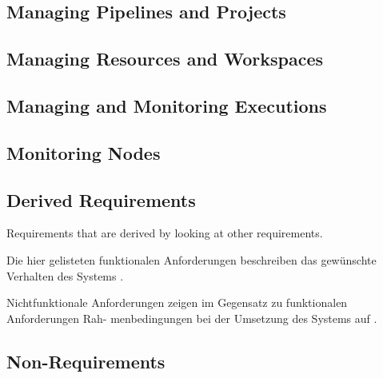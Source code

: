\subsection{Managing Pipelines and Projects}
\begin{itemize}
\end{itemize}

\subsection{Managing Resources and Workspaces}
\begin{itemize}
\end{itemize}


\subsection{Managing and Monitoring Executions}
\begin{itemize}
\end{itemize}

\subsection{Monitoring Nodes}
\begin{itemize}
\end{itemize}

\subsection{Derived Requirements} 
Requirements that are derived by looking at other requirements.



Die hier gelisteten funktionalen Anforderungen beschreiben das gewünschte Verhalten des
Systems \cite[155]{goll2012methoden}.

Nichtfunktionale Anforderungen zeigen im Gegensatz zu funktionalen Anforderungen Rah-
menbedingungen bei der Umsetzung des Systems auf \cite[155]{goll2012methoden}.


\subsection{Non-Requirements}



